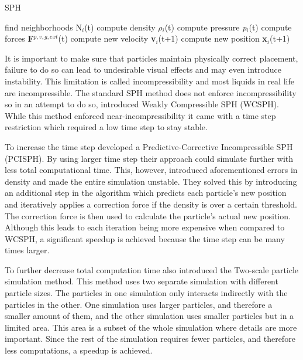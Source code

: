 \documentclass[../../main.tex]{subfiles}
\begin{document}
\begin{algorithm}[h]
   \caption{SPH}
    \label{alg:sph}
    \begin{algorithmic}[1]
            \State find neighborhoods N$_i$(t)
        \EndFor
            \State compute density \textbf{$\rho$}$_i$(t)
            \State compute pressure \textit{p}$_i$(t)
        \EndFor
            \State compute forces \textbf{F}$^{p, v, g, ext}$(t)
        \EndFor
            \State compute new velocity \textbf{v}$_i$(t+1)
            \State compute new position \textbf{x}$_i$(t+1)
        \EndFor
    \EndWhile
   \end{algorithmic}
\end{algorithm}

It is important to make sure that particles maintain physically correct placement, failure to do so can lead to undesirable visual effects and may even introduce instability. This limitation is called incompressibility and most liquids in real life are incompressible. The standard SPH method \citep{lucy1977numerical, gingold1977smoothed} does not enforce incompressibility so in an attempt to do so, \citet{becker2007weakly} introduced Weakly Compressible SPH (WCSPH). While this method enforced near-incompressibility it came with a time step restriction which required a low time step to stay stable.

To increase the time step \citet{solenthaler2009predictive} developed a Predictive-Corrective Incompressible SPH (PCISPH). By using larger time step their approach could simulate further with less total computational time. This, however, introduced aforementioned errors in density and made the entire simulation unstable. They solved this by introducing an additional step in the algorithm which predicts each particle's new position and iteratively applies a correction force if the density is over a certain threshold. The correction force is then used to calculate the particle's actual new position. Although this leads to each iteration being more expensive when compared to WCSPH, a significant speedup is achieved because the time step can be many times larger.

To further decrease total computation time \citet{solenthaler2011two} also introduced the Two-scale particle simulation method. This method uses two separate simulation with different particle sizes. The particles in one simulation only interacts indirectly with the particles in the other. One simulation uses larger particles, and therefore a smaller amount of them, and the other simulation uses smaller particles but in a limited area. This area is a subset of the whole simulation where details are more important. Since the rest of the simulation requires fewer particles, and therefore less computations, a speedup is achieved. 
\end{document}
